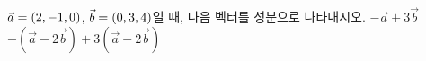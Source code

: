 $\vec{a}=(2{,}\mkern3mu\mathopen{}-1{,}\mkern3mu\mathopen{}0)$, $\vec{b}=(0{,}\mkern3mu\mathopen{}3{,}\mkern3mu\mathopen{}4)$일 때, 다음 벡터를 성분으로 나타내시오.
 $-\vec{a}+3\vec{b}$
 $-(\vec{a}-2\vec{b})+3(\vec{a}-2\vec{b})$
